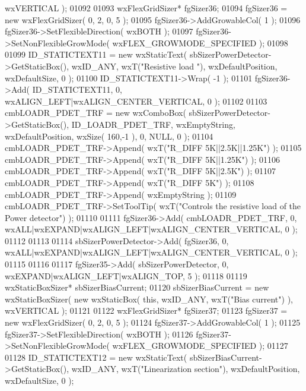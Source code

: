 \begin{DoxyCode}
      wxVERTICAL );
01092     
01093     wxFlexGridSizer* fgSizer36;
01094     fgSizer36 = \textcolor{keyword}{new} wxFlexGridSizer( 0, 2, 0, 5 );
01095     fgSizer36->AddGrowableCol( 1 );
01096     fgSizer36->SetFlexibleDirection( wxBOTH );
01097     fgSizer36->SetNonFlexibleGrowMode( wxFLEX\_GROWMODE\_SPECIFIED );
01098     
01099     ID_STATICTEXT11 = \textcolor{keyword}{new} wxStaticText( sbSizerPowerDetector->GetStaticBox(), wxID\_ANY, wxT(\textcolor{stringliteral}{"Resistive load
      "}), wxDefaultPosition, wxDefaultSize, 0 );
01100     ID_STATICTEXT11->Wrap( -1 );
01101     fgSizer36->Add( ID_STATICTEXT11, 0, wxALIGN\_LEFT|wxALIGN\_CENTER\_VERTICAL, 0 );
01102     
01103     cmbLOADR_PDET_TRF = \textcolor{keyword}{new} wxComboBox( sbSizerPowerDetector->GetStaticBox(), 
      ID_LOADR_PDET_TRF, wxEmptyString, wxDefaultPosition, wxSize( 160,-1 ), 0, NULL, 0 );
01104     cmbLOADR_PDET_TRF->Append( wxT(\textcolor{stringliteral}{"R\_DIFF 5K||2.5K||1.25K"}) );
01105     cmbLOADR_PDET_TRF->Append( wxT(\textcolor{stringliteral}{"R\_DIFF 5K||1.25K"}) );
01106     cmbLOADR_PDET_TRF->Append( wxT(\textcolor{stringliteral}{"R\_DIFF 5K||2.5K"}) );
01107     cmbLOADR_PDET_TRF->Append( wxT(\textcolor{stringliteral}{"R\_DIFF 5K"}) );
01108     cmbLOADR_PDET_TRF->Append( wxEmptyString );
01109     cmbLOADR_PDET_TRF->SetToolTip( wxT(\textcolor{stringliteral}{"Controls the resistive load of the Power detector"}) );
01110     
01111     fgSizer36->Add( cmbLOADR_PDET_TRF, 0, wxALL|wxEXPAND|wxALIGN\_LEFT|wxALIGN\_CENTER\_VERTICAL, 0 );
01112     
01113     
01114     sbSizerPowerDetector->Add( fgSizer36, 0, wxALL|wxEXPAND|wxALIGN\_LEFT|wxALIGN\_CENTER\_VERTICAL, 0 );
01115     
01116     
01117     fgSizer35->Add( sbSizerPowerDetector, 0, wxEXPAND|wxALIGN\_LEFT|wxALIGN\_TOP, 5 );
01118     
01119     wxStaticBoxSizer* sbSizerBiasCurrent;
01120     sbSizerBiasCurrent = \textcolor{keyword}{new} wxStaticBoxSizer( \textcolor{keyword}{new} wxStaticBox( \textcolor{keyword}{this}, wxID\_ANY, wxT(\textcolor{stringliteral}{"Bias current"}) ), 
      wxVERTICAL );
01121     
01122     wxFlexGridSizer* fgSizer37;
01123     fgSizer37 = \textcolor{keyword}{new} wxFlexGridSizer( 0, 2, 0, 5 );
01124     fgSizer37->AddGrowableCol( 1 );
01125     fgSizer37->SetFlexibleDirection( wxBOTH );
01126     fgSizer37->SetNonFlexibleGrowMode( wxFLEX\_GROWMODE\_SPECIFIED );
01127     
01128     ID_STATICTEXT12 = \textcolor{keyword}{new} wxStaticText( sbSizerBiasCurrent->GetStaticBox(), wxID\_ANY, wxT(\textcolor{stringliteral}{"Linearization
       section"}), wxDefaultPosition, wxDefaultSize, 0 );

\end{DoxyCode}
